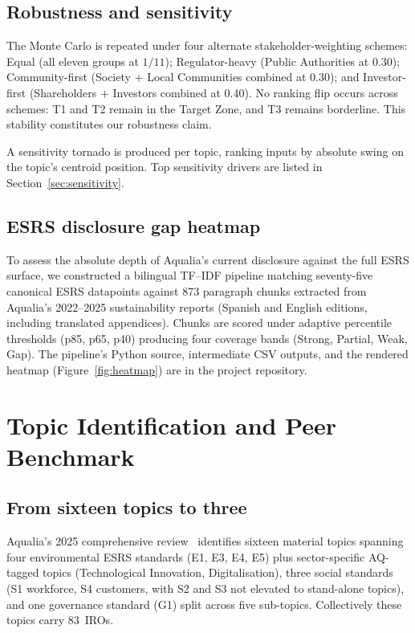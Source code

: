 \documentclass[11pt, a4paper, twoside, openright]{scrreprt}
\begin{document}
\section{Robustness and sensitivity}

The Monte Carlo is repeated under four alternate stakeholder-weighting schemes: Equal (all eleven groups at $1/11$); Regulator-heavy (Public Authorities at 0.30); Community-first (Society $+$ Local Communities combined at 0.30); and Investor-first (Shareholders $+$ Investors combined at 0.40). No ranking flip occurs across schemes: T1 and T2 remain in the Target Zone, and T3 remains borderline. This stability constitutes our robustness claim.

A sensitivity tornado is produced per topic, ranking inputs by absolute swing on the topic's centroid position. Top sensitivity drivers are listed in Section~\ref{sec:sensitivity}.

\section{ESRS disclosure gap heatmap}

To assess the absolute depth of Aqualia's current disclosure against the full ESRS surface, we constructed a bilingual TF--IDF pipeline matching seventy-five canonical ESRS datapoints against 873 paragraph chunks extracted from Aqualia's 2022--2025 sustainability reports (Spanish and English editions, including translated appendices). Chunks are scored under adaptive percentile thresholds (p85, p65, p40) producing four coverage bands (Strong, Partial, Weak, Gap). The pipeline's Python source, intermediate CSV outputs, and the rendered heatmap (Figure~\ref{fig:heatmap}) are in the project repository.

\chapter{Topic Identification and Peer Benchmark}
\label{chap:topics}

\section{From sixteen topics to three}

Aqualia's 2025 comprehensive review~\cite{aqualiaDMReview2025} identifies sixteen material topics spanning four environmental ESRS standards (E1, E3, E4, E5) plus sector-specific AQ-tagged topics (Technological Innovation, Digitalisation), three social standards (S1 workforce, S4 customers, with S2 and S3 not elevated to stand-alone topics), and one governance standard (G1) split across five sub-topics. Collectively these topics carry 83~IROs.
\end{document}
